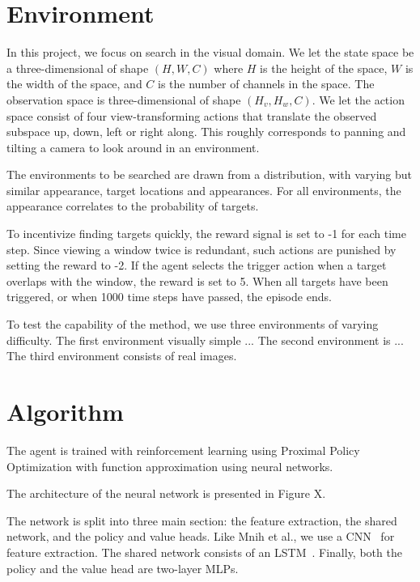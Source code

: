 
\section{Environment}
\label{sec:environment}

In this project, we focus on search in the visual domain.
We let the state space be a three-dimensional of shape \((H, W, C)\) where \(H\) is the height of the space, \(W\) is the width of the space, and \(C\) is the number of channels in the space.
The observation space is three-dimensional of shape \((H_v, H_w, C)\).
We let the action space consist of four view-transforming actions that translate the observed subspace up, down, left or right along.
This roughly corresponds to panning and tilting a camera to look around in an environment.

The environments to be searched are drawn from a distribution, with varying but similar appearance, target locations and appearances.
For all environments, the appearance correlates to the probability of targets.

To incentivize finding targets quickly, the reward signal is set to -1 for each time step.
Since viewing a window twice is redundant, such actions are punished by setting the reward to -2.
If the agent selects the trigger action when a target overlaps with the window, the reward is set to 5.
When all targets have been triggered, or when 1000 time steps have passed, the episode ends.

To test the capability of the method, we use three environments of varying difficulty.
The first environment visually simple ...
The second environment is ...
The third environment consists of real images.



\section{Algorithm}
\label{sec:algorithm}

The agent is trained with reinforcement learning using Proximal Policy Optimization with function approximation using neural networks. 

The architecture of the neural network is presented in Figure X.

The network is split into three main section: the feature extraction, the shared network, and the policy and value heads.
Like Mnih et al., we use a CNN~\cite{} for feature extraction.
The shared network consists of an LSTM~\cite{hochreiter}.
Finally, both the policy and the value head are two-layer MLPs.

